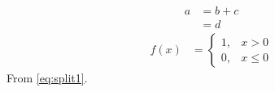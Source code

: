 \documentclass{article}
\begin{document}
\begin{equation}\label{eq:split1}
\begin{split}
a &= b + c \\
  &= d
\end{split}
\end{equation}
\begin{equation*}
\begin{split}
f(x) &= \begin{cases} 1, & x > 0 \\ 0, & x \le 0 \end{cases}
\end{split}
\end{equation*}
From \eqref{eq:split1}.
\end{document}
